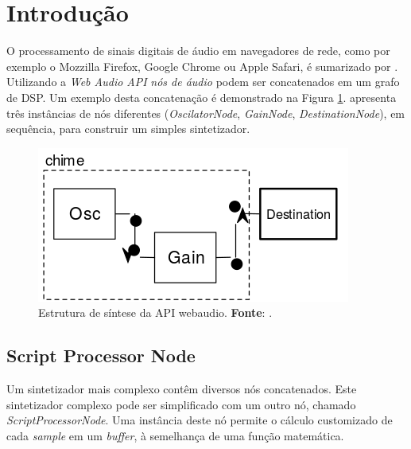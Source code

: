 \section{Introdução}\label{sec:introducao}




O processamento de sinais digitais de áudio em navegadores de rede, como por exemplo o Mozzilla Firefox, Google Chrome ou Apple Safari, é sumarizado por \cite{roberts_web_2013,wyse_viability_2014}. Utilizando a \emph{Web Audio API} \cite{w3c_web_2012} \emph{nós de áudio} podem ser concatenados em um grafo de DSP. Um exemplo desta concatenação é demonstrado na Figura \ref{fig:shime}.  \cite{srikumar_tamming_2013} apresenta três instâncias de nós diferentes (\emph{OscilatorNode}, \emph{GainNode}, \emph{DestinationNode}), em sequência, para construir um simples sintetizador.

\begin{figure}[h]
\centering
\includegraphics[scale=0.35]{chime.png}
\caption{Estrutura de síntese da API webaudio. \textbf{Fonte}: \cite{srikumar_tamming_2013}.}
\label{fig:shime}
\end{figure}

\subsection{Script Processor Node}

Um sintetizador mais complexo contêm diversos nós concatenados. Este sintetizador complexo pode ser simplificado com um outro nó, chamado \emph{ScriptProcessorNode}. Uma instância deste nó permite o cálculo customizado de cada \emph{sample} em um \emph{buffer}, à semelhança de uma função matemática. 

